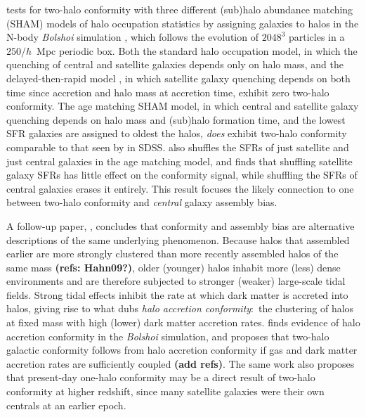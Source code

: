 \citet{Hearin15a} tests for two-halo conformity with three different (sub)halo abundance matching (SHAM) models of halo occupation statistics by assigning galaxies to halos in the N-body \emph{Bolshoi} simulation \citep{Klypin11}, which follows the evolution of $2048^3$ particles in a $250/h$~Mpc periodic box.
Both the standard halo occupation model, in which the quenching of central and satellite galaxies depends only on halo mass, and the delayed-then-rapid model \citep{Wetzel13}, in which satellite galaxy quenching depends on both time since accretion and halo mass at accretion time, exhibit zero two-halo conformity.
The age matching SHAM model, in which central and satellite galaxy quenching depends on halo mass and (sub)halo formation time, and the lowest SFR galaxies are assigned to oldest the halos, \emph{does} exhibit two-halo conformity comparable to that seen by \citet{Kauffmann13} in SDSS.
\citet{Hearin15a} also shuffles the SFRs of just satellite and just central galaxies in the age matching model, and finds that shuffling satellite galaxy SFRs has little effect on the conformity signal, while shuffling the SFRs of central galaxies erases it entirely.
This result focuses the likely connection to one between two-halo conformity and \emph{central} galaxy assembly bias.

A follow-up paper, \citet*{Hearin15b}, concludes that conformity and assembly bias are alternative descriptions of the same underlying phenomenon.
Because halos that assembled earlier are more strongly clustered than more recently assembled halos of the same mass {\bf(refs: Hahn09?)}, older (younger) halos inhabit more (less) dense environments and are therefore subjected to stronger (weaker) large-scale tidal fields.
Strong tidal effects inhibit the rate at which dark matter is accreted into halos, giving rise to what \citet{Hearin15b} dubs \emph{halo accretion conformity}:~the clustering of halos at fixed mass with high (lower) dark matter accretion rates.
\citet{Hearin15b} finds evidence of halo accretion conformity in the \emph{Bolshoi} simulation, and proposes that two-halo galactic conformity follows from halo accretion conformity if gas and dark matter accretion rates are sufficiently coupled {\bf(add refs)}.
% 
The same work also proposes that present-day one-halo conformity may be a direct result of two-halo conformity at higher redshift, since many satellite galaxies were their own centrals at an earlier epoch.

